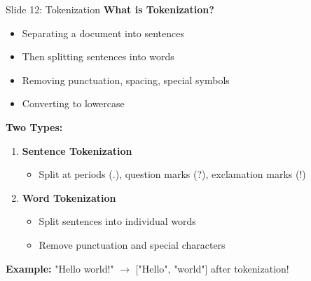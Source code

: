 \documentclass[8pt]{beamer}
\begin{document}
	\begin{frame}{Slide 12: Tokenization}
		\fontsize{6.5}{7.5}\selectfont
		\textbf{What is Tokenization?}
		\begin{itemize}
			\item Separating a document into sentences
			\item Then splitting sentences into words
			\item Removing punctuation, spacing, special symbols
			\item Converting to lowercase
		\end{itemize}
		
		\vspace{0.1cm}
		\textbf{Two Types:}
		\begin{enumerate}
			\item \textbf{Sentence Tokenization}
			\begin{itemize}
				\item Split at periods (.), question marks (?), exclamation marks (!)
			\end{itemize}
			\item \textbf{Word Tokenization}
			\begin{itemize}
				\item Split sentences into individual words
				\item Remove punctuation and special characters
			\end{itemize}
		\end{enumerate}
		
		\textcolor{myblue}{\textbf{Example:}} "Hello world!" $\to$ ["Hello", "world"] after tokenization!
	\end{frame}
	
\end{document}
